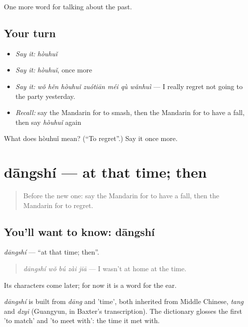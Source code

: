 \begin{grammarlens}[title={What you've built}]
One more word for talking about the past.
\end{grammarlens}

\subsection*{Your turn}
\begin{itemize}
\raggedright
  \item \emph{Say it:} \emph{hòuhuǐ}
  \item \emph{Say it:} \emph{hòuhuǐ}, once more
  \item \emph{Say it:} \emph{wǒ hěn hòuhuǐ zuótiān méi qù wǎnhuì} — I really regret not going to the party yesterday.
  \item \emph{Recall:} say the Mandarin for to smash, then the Mandarin for to have a fall, then say \emph{hòuhuǐ} again
\end{itemize}

\begin{tcolorbox}[breakable,colback=teal!4,colframe=teal!35!black,title={Before you move on}]
What does hòuhuǐ mean? (\textquotedblleft{}To regret\textquotedblright{}.) Say it once more.
\end{tcolorbox}
\section[dāngshí]{dāngshí — at that time; then}

\label{lesson:ZH-C187-dangshi}



\begin{quote}
Before the new one: say the Mandarin for to have a fall, then the Mandarin for to regret.
\end{quote}

\subsection*{You'll want to know: dāngshí}
\emph{dāngshí} — \textquotedblleft{}at that time; then\textquotedblright{}.

\begin{quote}
\emph{dāngshí wǒ bú zài jiā} — I wasn't at home at the time.
\end{quote}

Its characters come later; for now it is a word for the ear.

\begin{cousinweb}
\emph{dāngshí} is built from \emph{dāng} and  'time', both inherited from Middle Chinese, \emph{tang} and \emph{dzyi} (Guangyun, in Baxter's transcription). The dictionary glosses the first 'to match' and 'to meet with': the time it met with.
\end{cousinweb}

